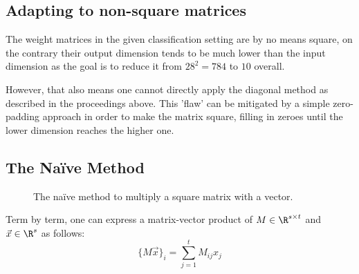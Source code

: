 \subsection{Adapting to non-square matrices}
\label{subsec:non-square-matrices}
The weight matrices in the given classification setting are by no means square, on the contrary their output dimension tends to be much lower than the input dimension as the goal is to reduce it from $28^2 = 784$ to $10$ overall.

However, that also means one cannot directly apply the diagonal method as described in the proceedings above.
This 'flaw' can be mitigated by a simple zero-padding approach in order to make the matrix square, filling in zeroes until the lower dimension reaches the higher one.

\subsection{The Naïve Method}
\begin{figure}[H]
  \centering
  \caption[Image adapted from \cite{2018-gazelle}]{The naïve method to multiply a square matrix with a vector.}
\end{figure}

Term by term, one can express a matrix-vector product of $M \in \R^{s \times t}$ and
$\vec{x} \in \R^s$ as follows:
$$\{M \vec{x}\}_i = \sum_{j=1}^{t} M_{ij} x_j$$

